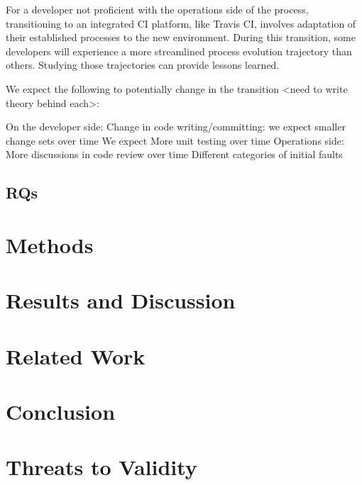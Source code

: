 \documentclass[conference]{IEEEtran}
\begin{document}
For a developer not proficient with the operations side of the process, transitioning to an integrated CI platform, like Travis CI, involves adaptation of their established processes to the new environment. During this transition, some developers will experience a more streamlined process evolution trajectory than others. Studying those trajectories can provide lessons learned.


We expect the following to potentially change in the transition <need to write theory behind each>:

On the developer side:
Change in code writing/committing: we expect smaller change sets over time
We expect More unit testing over time
Operations side:
More discussions in code review over time
Different categories of initial faults

\subsection{RQs}

\section{Methods}

\section{Results and Discussion}



\section{Related Work}

\section{Conclusion}

\section{Threats to Validity}


\end{document}
